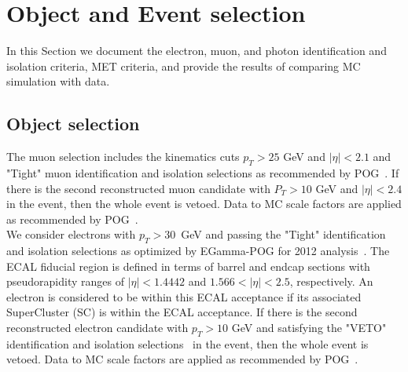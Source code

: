 \section{Object and Event selection}
\label{sec:ObjectSelection}
In this Section we document the electron, muon,
and photon identification and isolation criteria, MET criteria, and provide the
results of comparing MC simulation with data.

\subsection{Object selection}
The muon selection includes the kinematics cuts $p_T>25$ GeV and $|\eta|<2.1$ and "Tight" muon identification and isolation
selections as recommended by POG~\cite{muPOG}. 
If there is the second reconstructed muon candidate with $P_T>10$ GeV and $|\eta|<2.4$ in the event, then the whole event is vetoed. 
Data to MC scale factors are applied as recommended by POG~\cite{SFmuPOG}.\\

We consider electrons with $p_T>30$~GeV and passing
the "Tight" identification and isolation selections as optimized by EGamma-POG for 2012 analysis~\cite{egmPOG}.
The ECAL fiducial region is defined in terms of barrel and endcap
sections with pseudorapidity ranges of $|\eta| < 1.4442$ and  
$1.566 < |\eta| < 2.5$, respectively. An electron is considered
to be within this ECAL acceptance if its associated SuperCluster (SC) is
within the ECAL acceptance.
 If there is the second reconstructed electron candidate with $p_T>10$ GeV and satisfying the "VETO" identification and isolation selections~\cite{egmPOG}
in the event, then the whole event is vetoed.
Data to MC scale factors are applied as recommended by POG~\cite{SFegmPOG}.


